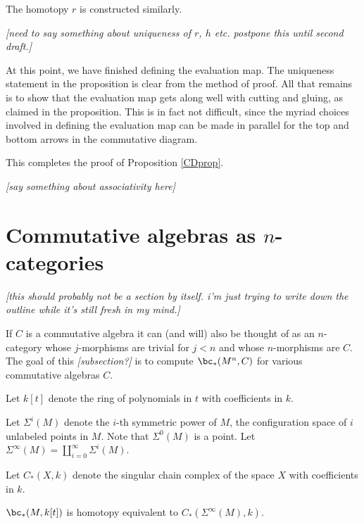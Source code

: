 \documentclass[11pt,leqno]{amsart}
\def\nn#1{{{\it \small [#1]}}}
\begin{document}
The homotopy $r$ is constructed similarly.

\nn{need to say something about uniqueness of $r$, $h$ etc.
postpone this until second draft.}

At this point, we have finished defining the evaluation map.
The uniqueness statement in the proposition is clear from the method of proof.
All that remains is to show that the evaluation map gets along well with cutting and gluing,
as claimed in the proposition.
This is in fact not difficult, since the myriad choices involved in defining the
evaluation map can be made in parallel for the top and bottom
arrows in the commutative diagram.

This completes the proof of Proposition \ref{CDprop}.

\medskip

\nn{say something about associativity here}







\section{Commutative algebras as $n$-categories}

\nn{this should probably not be a section by itself.  i'm just trying to write down the outline 
while it's still fresh in my mind.}

If $C$ is a commutative algebra it
can (and will) also be thought of as an $n$-category whose $j$-morphisms are trivial for
$j<n$ and whose $n$-morphisms are $C$. 
The goal of this \nn{subsection?} is to compute
$\bc_*(M^n, C)$ for various commutative algebras $C$.

Let $k[t]$ denote the ring of polynomials in $t$ with coefficients in $k$.

Let $\Sigma^i(M)$ denote the $i$-th symmetric power of $M$, the configuration space of $i$
unlabeled points in $M$.
Note that $\Sigma^0(M)$ is a point.
Let $\Sigma^\infty(M) = \coprod_{i=0}^\infty \Sigma^i(M)$.

Let $C_*(X, k)$ denote the singular chain complex of the space $X$ with coefficients in $k$.

\begin{prop} \label{sympowerprop}
$\bc_*(M, k[t])$ is homotopy equivalent to $C_*(\Sigma^\infty(M), k)$.
\end{prop}
\end{document}
